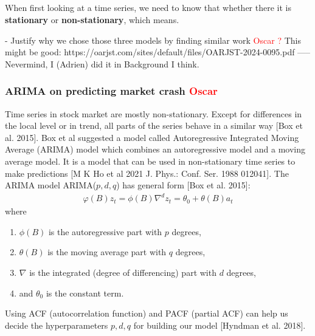 \documentclass[12pt, letterpaper]{article}
\begin{document}





\subparagraph*{}
When first looking at a time series, we need to know that whether there it is \textbf{stationary} or \textbf{non-stationary}, which means.

- Justify why we chose those three models by finding similar work \textcolor{red}{Oscar ?} This might be good: https://oarjst.com/sites/default/files/OARJST-2024-0095.pdf ----- Nevermind, I (Adrien) did it in Background I think.
    \subsubsection*{ARIMA on predicting market crash \textcolor{red}{Oscar}}
    Time series in stock market are mostly non-stationary. Except for differences in the local level or in trend, all parts of the series behave in a similar way [Box et al. 2015]. Box et al suggested a model called Autoregressive Integrated Moving Average (ARIMA) model which combines an autoregressive model and a moving average model. It is a model that can be used in non-stationary time series to make predictions [M K Ho et al 2021 J. Phys.: Conf. Ser. 1988 012041].
    The ARIMA model ARIMA($p,d,q$) has general form [Box et al. 2015]:
    \begin{align*}
        \varphi (B) z_t = \phi (B)\nabla^d z_t = \theta_0 + \theta (B)a_t
    \end{align*}
    where
    \begin{enumerate}[label=\arabic*.]
        \item $\phi(B)$ is the autoregressive part with $p$ degrees,
        \item $\theta (B)$ is the moving average part with $q$ degrees,
        \item $\nabla$ is the integrated (degree of differencing) part with $d$ degrees,
        \item and $\theta_0$ is the constant term.
    \end{enumerate}
    Using ACF (autocorrelation function) and PACF (partial ACF) can help us decide the hyperparameters $p, d, q$ for building our model [Hyndman et al. 2018].
\end{document}
